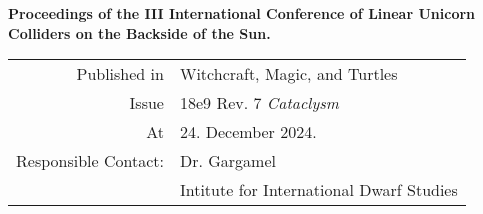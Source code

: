 
\begin{center}\vspace*{10mm}

\huge \textbf{\Title}\vspace{12mm}

\Large        \Author






\large \textbf{Proceedings of the III International Conference of Linear Unicorn Colliders on the Backside of the Sun.}\vspace{10mm}


\small
\begin{tabular}{rl}
     Published in & \large Witchcraft, Magic, and Turtles \\[2mm]
            Issue & \large 18e9 Rev. 7 \emph{Cataclysm} \\[2mm]
               At & \large 24. December 2024.\\[10mm]
   Responsible Contact: & \large Dr. Gargamel \\[1mm]
                  & Intitute for International Dwarf Studies
\end{tabular}


\end{center}

\thispagestyle{empty}
\cleardoublepage

\setlength{\topmargin}{0mm}
\normalsize%

